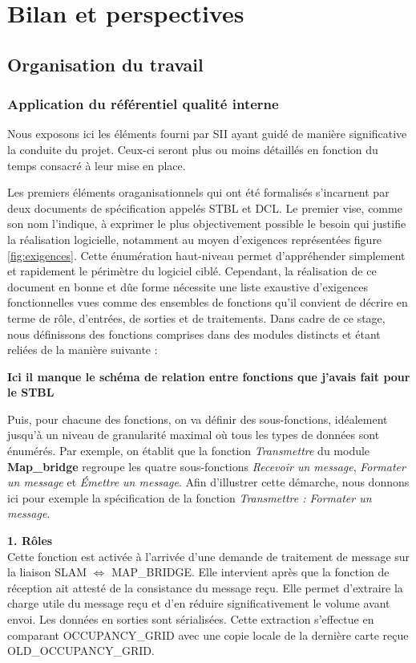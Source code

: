 \chapter{Bilan et perspectives}
\label{chap:bilan}

\section{Organisation du travail}
\label{sec:orga}
  \subsection{Application du référentiel qualité interne}
  
  Nous exposons ici les éléments fourni par SII ayant guidé de manière significative la conduite du projet. 
  Ceux-ci seront plus ou moins détaillés en fonction du temps consacré à leur mise en place.
  
  Les premiers éléments oraganisationnels qui ont été formalisés s'incarnent par deux documents de spécification appelés \gls{STBL} et \gls{DCL}.
  Le premier vise, comme son nom l'indique, à exprimer le plus objectivement possible le besoin qui justifie la réalisation logicielle, notamment au moyen d'exigences représentées figure \ref{fig:exigences}. 
  Cette énumération haut-niveau permet d'appréhender simplement et rapidement le périmètre du logiciel ciblé. 
  Cependant, la réalisation de ce document en bonne et dûe forme nécessite une liste exaustive d'exigences fonctionnelles vues comme des ensembles de fonctions qu'il convient de décrire en terme de rôle, d'entrées, de sorties et
  de traitements. 
  Dans cadre de ce stage, nous définissons des fonctions comprises dans des modules distincts et étant reliées de la manière suivante : 
  
  \textbf{Ici il manque le schéma de relation entre fonctions que j'avais fait pour le STBL}
  
  Puis, pour chacune des fonctions, on va définir des sous-fonctions, idéalement jusqu'à un niveau de granularité maximal où tous les types de données sont énumérés. 
  Par exemple, on établit que la fonction \emph{Transmettre} du module \textbf{\textcolor{red-stbl}{Map\_bridge}} regroupe les quatre sous-fonctions \emph{Recevoir un message}, \emph{Formater un message} et \emph{\'{E}mettre un message}. 
  Afin d'illustrer cette démarche, nous donnons ici pour exemple la spécification de la fonction \emph{Transmettre : Formater un message}. 
  
  \textbf{1. Rôles } \\
  Cette fonction est activée à l’arrivée d’une demande de traitement de message sur la liaison SLAM $\Longleftrightarrow{}$ MAP\_BRIDGE.
  Elle intervient après que la fonction de réception ait attesté de la consistance du message reçu.
  Elle permet d’extraire la charge utile du message reçu et d’en réduire significativement le volume avant envoi.  Les données en sorties sont sérialisées.
  Cette extraction s’effectue en comparant OCCUPANCY\_GRID avec une copie locale de la dernière carte reçue OLD\_OCCUPANCY\_GRID.
  
